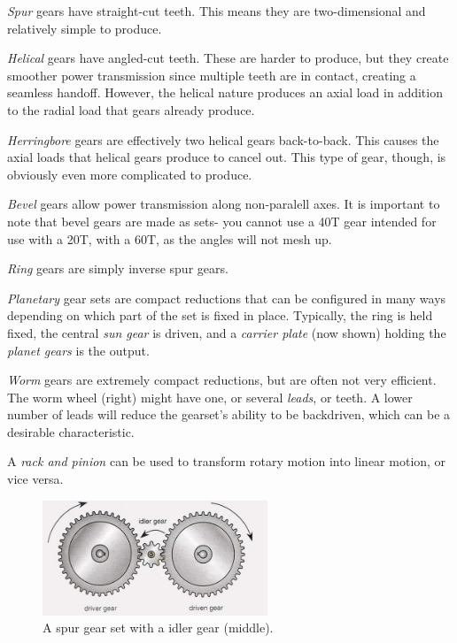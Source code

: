 \documentclass[10pt,letterpaper]{book}
\begin{document}
\begin{asparaenum}[a)]
	\item \textit{Spur} gears have straight-cut teeth. This means they are two-dimensional and relatively simple to produce.
	\item \textit{Helical} gears have angled-cut teeth. These are harder to produce, but they create smoother power transmission since multiple teeth are in contact, creating a seamless handoff. However, the helical nature produces an axial load in addition to the radial load that gears already produce. 
	\item \textit{Herringbore} gears are effectively two helical gears back-to-back. This causes the axial loads that helical gears produce to cancel out. This type of gear, though, is obviously even more complicated to produce.
	\item \textit{Bevel} gears allow power transmission along non-paralell axes. It is important to note that bevel gears are made as sets- you cannot use a 40T gear intended for use with a 20T, with a 60T, as the angles will not mesh up.
	\item \textit{Ring} gears are simply inverse spur gears.
	\item \textit{Planetary} gear sets are compact reductions that can be configured in many ways depending on which part of the set is fixed in place. Typically, the ring is held fixed, the central \textit{sun gear} is driven, and a \textit{carrier plate} (now shown) holding the \textit{planet gears} is the output.
	\item \textit{Worm} gears are extremely compact reductions, but are often not very efficient. The worm wheel (right) might have one, or several \textit{leads}, or teeth. A lower number of leads will reduce the gearset's ability to be backdriven, which can be a desirable characteristic.
	\item A \textit{rack and pinion} can be used to transform rotary motion into linear motion, or vice versa.	
\end{asparaenum}

\begin{figure}[H]
	\includegraphics[width=0.6\textwidth]{imgs/gearset_idler.jpeg}
	\caption{A spur gear set with a idler gear (middle).}
\end{figure}
\end{document}
